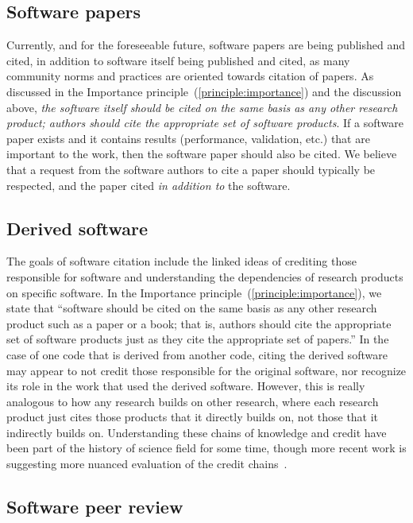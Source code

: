 \documentclass[12pt, oneside]{amsart}
\begin{document}
\subsection{Software papers} \label{sec:software_papers}

Currently, and for the foreseeable future, software papers are being published and cited,
in addition to software itself being published and cited, as many community norms and practices are
oriented towards citation of papers.
As discussed in the Importance principle~(\ref{principle:importance}) and the discussion above, \textit{the software
itself should be cited on the same basis as any other research product; authors should cite the appropriate set of software products}.
If a software paper exists and it contains results (performance, validation, etc.) that are
important to the work, then the software paper should also be cited.
We believe that a request from the software authors to cite a paper should typically be respected, and the paper cited \textit{in addition to} the software.

\subsection{Derived software}

The goals of software citation include the linked ideas of crediting those responsible for software and understanding the dependencies of research products on specific software.
In the Importance principle~(\ref{principle:importance}), we state that
``software should be cited on the same basis as any other research product such as a paper or a book; that is, authors should cite the appropriate set of software products just as they cite the appropriate set of papers.''
In the case of one code that is derived from another code, citing the derived software may appear to not credit those responsible for the original software, nor recognize its role in the work that used the derived software.
However, this is really analogous to how any research builds on other research, where each research product just cites those products that it directly builds on, not those that it indirectly builds on.
Understanding these chains of knowledge and credit have been part of the history of science field for some time, though more recent work is suggesting more nuanced evaluation of the credit chains~\cite{casrai-credit, transitive_credit_json-ld}.

\subsection{Software peer review}
\end{document}
